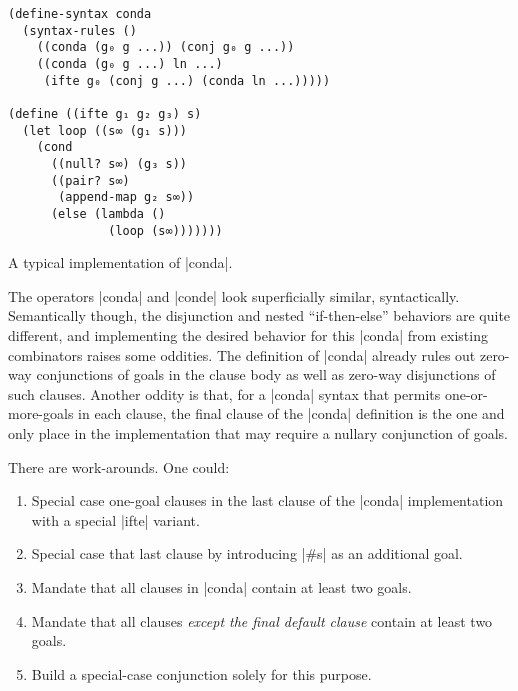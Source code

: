 \documentclass[sigplan,screen,draft,anonymous,review,natbib=false]{acmart}
\begin{document}
\begin{listing}
  \begin{verbatim}
(define-syntax conda
  (syntax-rules ()
    ((conda (g₀ g ...)) (conj g₀ g ...))
    ((conda (g₀ g ...) ln ...)
     (ifte g₀ (conj g ...) (conda ln ...)))))

(define ((ifte g₁ g₂ g₃) s)
  (let loop ((s∞ (g₁ s)))
    (cond
      ((null? s∞) (g₃ s))
      ((pair? s∞)
       (append-map g₂ s∞))
      (else (lambda ()
              (loop (s∞)))))))
  \end{verbatim}
  \caption{A typical implementation of \rackinline|conda|.}
  \label{mnt:conda-implementation}
\end{listing}

The operators \rackinline|conda| and \rackinline|conde| look
superficially similar, syntactically. Semantically though, the
disjunction and nested \enquote{if-then-else} behaviors are quite
different, and implementing the desired behavior for this
\rackinline|conda| from existing combinators raises some oddities. The
definition of \rackinline|conda| already rules out zero-way
conjunctions of goals in the clause body as well as zero-way
disjunctions of such clauses. Another oddity is that, for a
\rackinline|conda| syntax that permits one-or-more-goals in each
clause, the final clause of the \rackinline|conda| definition is the
one and only place in the implementation that may require a nullary
conjunction of goals.

There are work-arounds. One could:

\begin{enumerate}

\item Special case one-goal clauses in the last clause of the
  \rackinline|conda| implementation with a special \rackinline|ifte|
  variant.

\item Special case that last clause by introducing \rackinline|#s| as
  an additional goal.

\item Mandate that all clauses in \rackinline|conda| contain at least two goals.

\item Mandate that all clauses \emph{except the final default clause} contain at
  least two goals.

\item Build a special-case conjunction solely for this purpose.
\end{enumerate}
\end{document}
